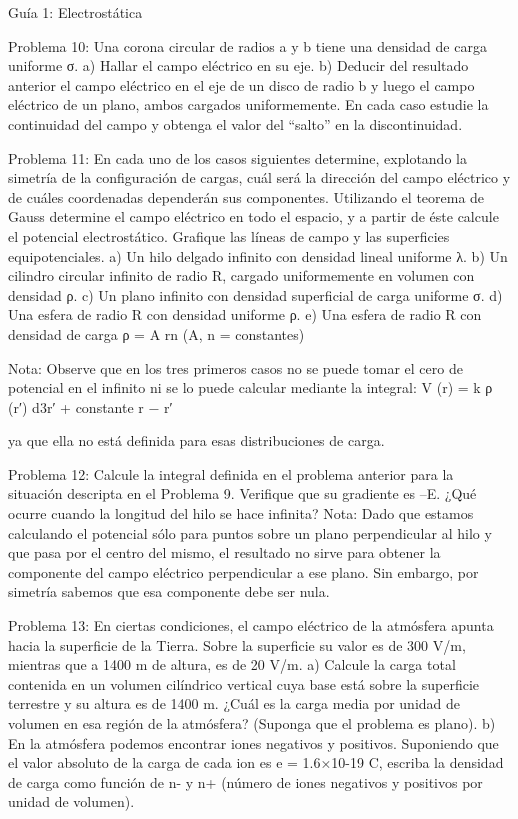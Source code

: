 

Guía 1: Electrostática



Problema 10:
Una corona circular de radios a y b tiene una densidad de carga uniforme σ.
a)	Hallar el campo eléctrico en su eje.
b)	Deducir del resultado anterior el campo eléctrico en el eje de un disco de radio b y luego el campo eléctrico de un plano, ambos cargados uniformemente. En cada caso estudie la continuidad del campo y obtenga el valor del “salto” en la discontinuidad.

Problema 11:
En cada uno de los casos siguientes determine, explotando la simetría de la configuración de cargas, cuál será la dirección del campo eléctrico y de cuáles coordenadas dependerán sus componentes. Utilizando el teorema de Gauss determine el campo eléctrico en todo el espacio, y a partir de éste calcule el potencial electrostático. Grafique las líneas de campo y las superficies equipotenciales.
a)	Un hilo delgado infinito con densidad lineal uniforme λ.
b)	Un cilindro circular infinito de radio R, cargado uniformemente en volumen con densidad
ρ.
c)	Un plano infinito con densidad superficial de carga uniforme σ.
d)	Una esfera de radio R con densidad uniforme ρ.
e)	Una esfera de radio R con densidad de carga ρ = A rn (A, n = constantes)

Nota: Observe que en los tres primeros casos no se puede tomar el cero de potencial en el infinito ni se lo puede calcular mediante la integral:
V (r) = k	ρ (r′) d3r′ + constante
r − r′

ya que ella no está definida para esas distribuciones de carga.
 


Problema 12:
Calcule la integral definida en el problema anterior para la situación descripta en el Problema 9. Verifique que su gradiente es –E. ¿Qué ocurre cuando la longitud del hilo se hace infinita? Nota: Dado que estamos calculando el potencial sólo para puntos sobre un plano perpendicular al hilo y que pasa por el centro del mismo, el resultado no sirve para obtener la componente del campo  eléctrico  perpendicular  a  ese  plano.  Sin  embargo,  por  simetría  sabemos  que  esa componente debe ser nula.

Problema 13:
En ciertas condiciones, el campo eléctrico de la atmósfera apunta hacia la superficie de la Tierra. Sobre la superficie su valor es de 300 V/m, mientras que a 1400 m de altura, es de 20 V/m.
a)	Calcule la carga total contenida en un volumen cilíndrico vertical cuya base está sobre la superficie terrestre y su altura es de 1400 m. ¿Cuál es la carga media por unidad de volumen en esa región de la atmósfera? (Suponga que el problema es plano).
b)	En la atmósfera podemos encontrar iones negativos y positivos. Suponiendo que el valor absoluto de la carga de cada ion es e = 1.6×10-19 C, escriba la densidad de carga como función de n- y n+ (número de iones negativos y positivos por unidad de volumen).

